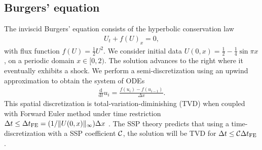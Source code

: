 \subsection{Burgers' equation}\label{subsubsec:burgers}
The inviscid Burgers' equation consists of the hyperbolic conservation law
\begin{align}\label{eq:HCL}
    U_{t} + f(U)_{x} = 0,
\end{align}
with flux function $f(U) = \frac{1}{2}U^{2}$. 
We consider initial data
$U(0,x)  = \frac{1}{2} - \frac{1}{4}\sin{\pi x}$,
on a periodic domain $x \in [0,2)$.
The solution advances to the right where it eventually exhibits a shock. 
We perform a semi-discretization
using an upwind approximation to obtain the system of ODEs
\begin{align*}\label{eq:burgers_flux}
	\frac{\textrm{d}}{\textrm{d} t} u_i = \frac{f(u_{i}) - f(u_{i-1})}{\Delta x}.
\end{align*}
This spatial discretization is total-variation-diminishing (TVD) when
coupled with Forward Euler method under time restriction
$\Delta t \leq {\Delta t}_{\text{FE}} = (1 / \|U(0,x)\|_{\infty}) \Delta x$
\cite{Laney:1998,Ketcheson/Macdonald/Gottlieb:2009}.
The SSP theory predicts that using a time-discretization with a SSP
coefficient $\mathcal{C}$, the solution will be TVD for $\Delta t \leq
\mathcal{C} {\Delta t}_{\text{FE}}$.

